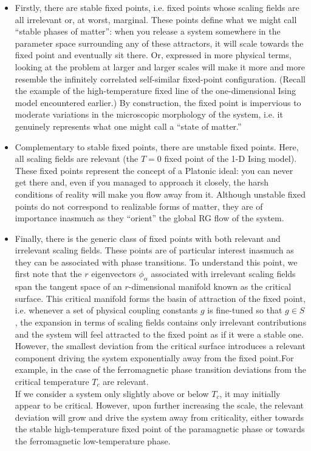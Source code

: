 \begin{itemize}
\item Firstly, there are stable fixed points, i.e. fixed points whose scaling fields are all irrelevant or, at worst, marginal. 
These points define what we might call ``stable phases of
matter'': when you release a system somewhere in the parameter space surrounding any of these attractors, it will scale towards the fixed point and eventually sit there. Or,
expressed in more physical terms, looking at the problem at larger and larger scales will make it more and more resemble the infinitely correlated self-similar fixed-point configuration. (Recall the example of the high-temperature fixed line of the one-dimensional Ising
model encountered earlier.) 
By construction, the fixed point is impervious to moderate
variations in the microscopic morphology of the system, i.e. it genuinely represents what one might call a ``state of matter.''
\item Complementary to stable fixed points, there are unstable fixed points. Here, all scaling fields are relevant (the $T = 0$ fixed point of the 1-D Ising model). These fixed points represent the concept of a Platonic ideal: you can never get there and, even if you managed to approach it closely, the harsh conditions of reality will make you flow away from it.
Although unstable fixed points do not correspond to realizable forms of matter, they are of importance inasmuch as they ``orient'' the global RG flow of the system.
\item Finally, there is the generic class of fixed points with both relevant and irrelevant scaling fields. These points are of particular interest inasmuch as they can be associated with phase transitions. 
To understand this point, we first note that the $r$ eigenvectors $\phi_{\alpha}$ associated with irrelevant scaling fields span the tangent space of an $r$-dimensional
manifold known as the critical surface. 
This critical manifold forms the basin of attraction of the fixed point, i.e. whenever a set of physical coupling constants $g$ is fine-tuned so that $g \in S$, the
expansion in terms of scaling fields contains only irrelevant contributions and the system will feel attracted to the fixed point as if it were a stable one.
\\
However, the smallest deviation from the critical surface introduces a relevant component driving the system exponentially away from the fixed point.For example, in the
case of the ferromagnetic phase transition  deviations from the critical temperature $T_c$ are relevant. 
\\
If we consider a system only slightly above or below $T_c$, it may initially appear to be critical. However, upon further increasing the scale, the relevant deviation will grow and drive the system away from criticality, either towards the stable high-temperature fixed point of the paramagnetic phase or towards the ferromagnetic low-temperature phase.
\end{itemize}

